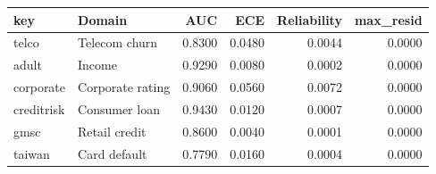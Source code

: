\begin{tabular}{llrrrr}
\toprule
key & Domain & AUC & ECE & Reliability & max\_resid \\
\midrule
telco & Telecom churn & 0.8300 & 0.0480 & 0.0044 & 0.0000 \\
adult & Income & 0.9290 & 0.0080 & 0.0002 & 0.0000 \\
corporate & Corporate rating & 0.9060 & 0.0560 & 0.0072 & 0.0000 \\
creditrisk & Consumer loan & 0.9430 & 0.0120 & 0.0007 & 0.0000 \\
gmsc & Retail credit & 0.8600 & 0.0040 & 0.0001 & 0.0000 \\
taiwan & Card default & 0.7790 & 0.0160 & 0.0004 & 0.0000 \\
\bottomrule
\end{tabular}
